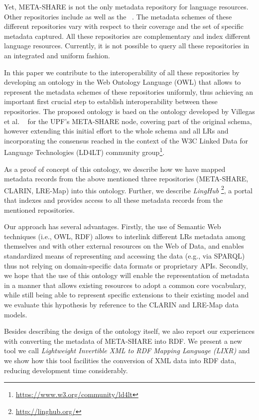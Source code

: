 \documentclass{llncs}
\begin{document}
Yet, META-SHARE is not the only metadata repository for language resources. Other repositories include \cite[CLARIN]{broeder2010data} as well as the 
~\cite[LRE-Map]{calzolari2012lre}. The metadata schemes of these different repositories vary with respect to their coverage and the set of specific metadata captured. 
All these repositories are complementary and index different language resources. Currently, it is not possible to query all these repositories in an integrated and uniform fashion. 

In this paper we contribute to the interoperability of all these repositories by developing an ontology in the Web Ontology Language (OWL) that allows to represent the metadata schemes of these repositories uniformly, thus achieving an important first crucial step to establish interoperability between these repositories. The proposed ontology is baed on the ontology developed by Villegas et al. ~\cite{Villegas2014} for the UPF's META-SHARE node, covering part of the original schema, however extending this initial effort to the whole schema and all LRs and incorporating the consensus 
reached in the context of the W3C Linked Data for Language Technologies (LD4LT) community group\footnote{\url{https://www.w3.org/community/ld4lt}}.

As a proof of concept of this ontology, we describe how we have mapped metadata records from the above mentioned three repositories (META-SHARE, CLARIN, LRE-Map) into this ontology. Further, we describe \emph{LingHub} \footnote{\url{http://linghub.org/}}, a portal that indexes and provides access to all these metadata records from the mentioned repositories. 

Our approach has several advantages. Firstly, the use of Semantic Web techniques (i.e., OWL, RDF) allows to
interlink different LRs metadata among themselves and with other external resources on the Web of Data, and enables standardized means of representing and accessing the data (e.g., via SPARQL) thus not relying on domain-specific data formats or proprietary APIs. Secondly, we hope that the use of this ontology will enable the representation of metadata in a manner that allows existing resources to adopt a
common core vocabulary, while still being able to represent specific extensions
to their existing model and we evaluate this hypothesis by reference to the
CLARIN and LRE-Map data models.

Besides describing the design of the ontology itself, we also report our experiences with converting the metadata of META-SHARE into RDF.
We present a new tool we call \emph{Lightweight Invertible XML to RDF Mapping
Language (LIXR)} and we show how this tool facilities the conversion of XML data into RDF data, reducing development time considerably.
\end{document}
